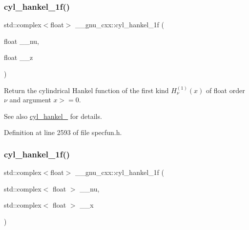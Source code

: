 \subsubsection{\texorpdfstring{cyl\+\_\+hankel\+\_\+1f()}{cyl\_hankel\_1f()}\hspace{0.1cm}{\footnotesize\ttfamily [1/2]}}
{\footnotesize\ttfamily std\+::complex$<$float$>$ \+\_\+\+\_\+gnu\+\_\+cxx\+::cyl\+\_\+hankel\+\_\+1f (\begin{DoxyParamCaption}\item[{float}]{\+\_\+\+\_\+nu,  }\item[{float}]{\+\_\+\+\_\+z }\end{DoxyParamCaption})\hspace{0.3cm}{\ttfamily [inline]}}

Return the cylindrical Hankel function of the first kind $ H^{(1)}_\nu(x) $ of {\ttfamily float} order $ \nu $ and argument $ x >= 0 $.

\begin{DoxySeeAlso}{See also}
\hyperlink{group__gnu__math__spec__func_ga5329bba77d10a9d2f15d9bbe43a70db3}{cyl\+\_\+hankel\+\_} for details. 
\end{DoxySeeAlso}


Definition at line 2593 of file specfun.\+h.

\mbox{\label{group__gnu__math__spec__func_ga810e021a3f11c1b2253c15c6f4d41143}} 
\subsubsection{\texorpdfstring{cyl\+\_\+hankel\+\_\+1f()}{cyl\_hankel\_1f()}\hspace{0.1cm}{\footnotesize\ttfamily [2/2]}}
{\footnotesize\ttfamily std\+::complex$<$float$>$ \+\_\+\+\_\+gnu\+\_\+cxx\+::cyl\+\_\+hankel\+\_\+1f (\begin{DoxyParamCaption}\item[{std\+::complex$<$ float $>$}]{\+\_\+\+\_\+nu,  }\item[{std\+::complex$<$ float $>$}]{\+\_\+\+\_\+x }\end{DoxyParamCaption})\hspace{0.3cm}{\ttfamily [inline]}}

